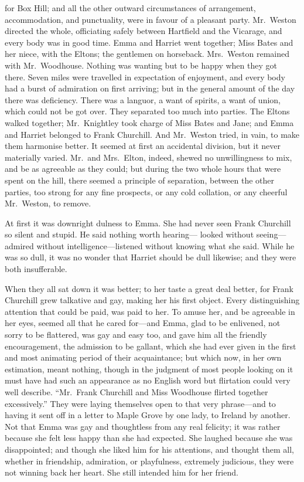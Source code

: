  for Box Hill; and all the other outward
circumstances of arrangement, accommodation, and punctuality,
were in favour of a pleasant party.  Mr.\ Weston directed the whole,
officiating safely between Hartfield and the Vicarage, and every
body was in good time.  Emma and Harriet went together; Miss Bates
and her niece, with the Eltons; the gentlemen on horseback.
Mrs.\ Weston remained with Mr.\ Woodhouse.  Nothing was wanting
but to be happy when they got there.  Seven miles were travelled
in expectation of enjoyment, and every body had a burst of admiration
on first arriving; but in the general amount of the day there
was deficiency.  There was a languor, a want of spirits, a want of union,
which could not be got over.  They separated too much into parties.
The Eltons walked together; Mr.\ Knightley took charge of Miss
Bates and Jane; and Emma and Harriet belonged to Frank Churchill.
And Mr.\ Weston tried, in vain, to make them harmonise better.  It seemed
at first an accidental division, but it never materially varied.
Mr.\ and Mrs.\ Elton, indeed, shewed no unwillingness to mix,
and be as agreeable as they could; but during the two whole hours
that were spent on the hill, there seemed a principle of separation,
between the other parties, too strong for any fine prospects, or any
cold collation, or any cheerful Mr.\ Weston, to remove.

At first it was downright dulness to Emma.  She had never seen Frank
Churchill so silent and stupid.  He said nothing worth hearing---%
looked without seeing---admired without intelligence---listened without
knowing what she said.  While he was so dull, it was no wonder that
Harriet should be dull likewise; and they were both insufferable.

When they all sat down it was better; to her taste a great deal better,
for Frank Churchill grew talkative and gay, making her his first object.
Every distinguishing attention that could be paid, was paid to her.
To amuse her, and be agreeable in her eyes, seemed all that he
cared for---and Emma, glad to be enlivened, not sorry to be flattered,
was gay and easy too, and gave him all the friendly encouragement,
the admission to be gallant, which she had ever given in the first
and most animating period of their acquaintance; but which now,
in her own estimation, meant nothing, though in the judgment of most
people looking on it must have had such an appearance as no English
word but flirtation could very well describe.  ``Mr.\ Frank Churchill
and Miss Woodhouse flirted together excessively.''  They were laying
themselves open to that very phrase---and to having it sent off
in a letter to Maple Grove by one lady, to Ireland by another.
Not that Emma was gay and thoughtless from any real felicity;
it was rather because she felt less happy than she had expected.
She laughed because she was disappointed; and though she liked him
for his attentions, and thought them all, whether in friendship,
admiration, or playfulness, extremely judicious, they were not winning
back her heart.  She still intended him for her friend.

